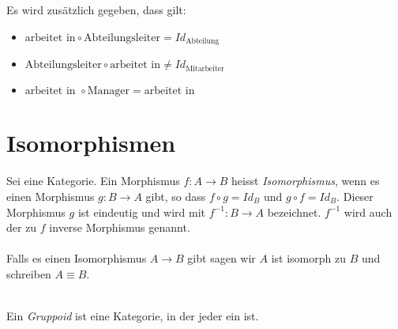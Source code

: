 \documentclass{article}
\renewcommand{\id}{\ensuremath{Id}}
\begin{document}
	 \begin{bsp}[Datenbanken]

		  \cite[Beispiel 2.2.33]{Bra} \\
		  \\
		 Es wird zus\"atzlich gegeben, dass gilt:

		 \begin{itemize}
			 \item \( \text{arbeitet \ in} \circ \text{Abteilungsleiter}= \id_\text{Abteilung}  \)
			 \item \( \text{Abteilungsleiter} \circ \text{arbeitet \ in} \neq \id_\text{Mitarbeiter}  \)
			 \item \( \text{arbeitet \ in }  \circ \text{Manager} = \text{arbeitet \ in } \)
		 \end{itemize}
	 \end{bsp}
	
	\section{Isomorphismen}
		
		\begin{defi}[Isomorphismus]
		 \cite[Definition 2.3.1]{Bra}
		Sei \CatC eine Kategorie. Ein Morphismus \( f: A \to B  \) heisst  \emph{Isomorphismus}, wenn es einen Morphismus \( g: B \to A \) gibt, so dass \( f \circ g  = \id_B \) und \( g \circ f = \id_B \). 
		Dieser Morphismus \( g \) ist eindeutig und wird mit \( f^{-1} :B \to A \) bezeichnet.
		\(f^{-1} \) wird auch der zu \( f \)  inverse Morphismus genannt.\\

		 \\

		Falls es einen Isomorphismus \( A \to B \) gibt sagen wir \( A \) ist isomorph zu \( B \) und schreiben \( A \equiv B \).
		\end{defi}
		
		\begin{defi}[Gruppoid]
		  \cite[Beispiel 2.2.34]{Bra} \\
		 Ein \emph{Gruppoid} ist eine Kategorie, in der jeder \Mor ein \Iso ist.
		\end{defi}
		  
\end{document}
